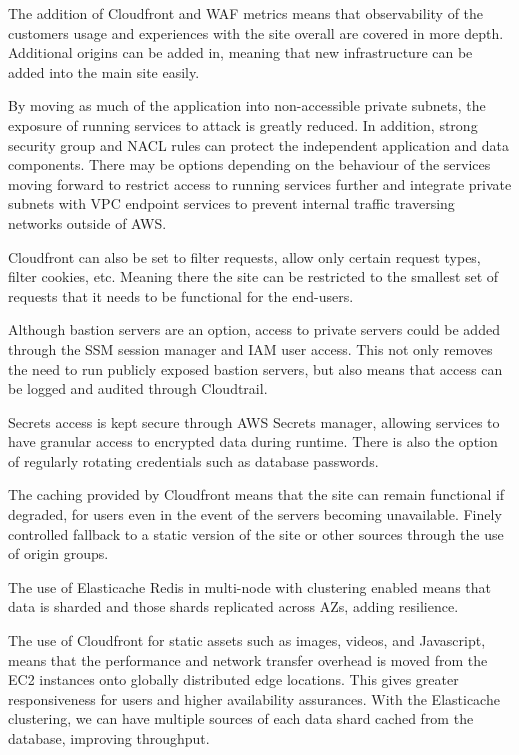 

The addition of Cloudfront and WAF metrics means that observability of the customers usage and experiences with the site overall are covered in more depth. Additional origins can be added in, meaning that new infrastructure can be added into the main site easily.


By moving as much of the application into non-accessible private subnets, the exposure of running services to attack is greatly reduced. In addition, strong security group and NACL rules can protect the independent application and data components. There may be options depending on the behaviour of the services moving forward to restrict access to running services further and integrate private subnets with VPC endpoint services to prevent internal traffic traversing networks outside of AWS.

Cloudfront can also be set to filter requests, allow only certain request types, filter cookies, etc. Meaning there the site can be restricted to the smallest set of requests that it needs to be functional for the end-users.

Although bastion servers are an option, access to private servers could be added through the SSM session manager and IAM user access. This not only removes the need to run publicly exposed bastion servers, but also means that access can be logged and audited through Cloudtrail.

Secrets access is kept secure through AWS Secrets manager, allowing services to have granular access to encrypted data during runtime. There is also the option of regularly rotating credentials such as database passwords.


The caching provided by Cloudfront means that the site can remain functional if degraded, for users even in the event of the servers becoming unavailable. Finely controlled fallback to a static version of the site or other sources through the use of origin groups.

The use of Elasticache Redis in multi-node with clustering enabled means that data is sharded and those shards replicated across AZs, adding resilience.


The use of Cloudfront for static assets such as images, videos, and Javascript, means that the performance and network transfer overhead is moved from the EC2 instances onto globally distributed edge locations. This gives greater responsiveness for users and higher availability assurances. With the Elasticache clustering, we can have multiple sources of each data shard cached from the database, improving throughput.


